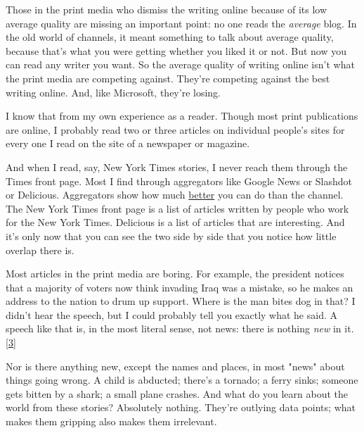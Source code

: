 Those in the print
                  media who dismiss the writing online because of its low
                  average quality are missing an important point: no one reads
                  the \emph{average} blog. In the old world of channels, it
                  meant something to talk about average quality, because that's
                  what you were getting whether you liked it or not. But now you
                  can read any writer you want. So the average quality of
                  writing online isn't what the print media are competing
                  against. They're competing against the best writing online.
                  And, like Microsoft, they're losing.

I know that
                  from my own experience as a reader. Though most print
                  publications are online, I probably read two or three articles
                  on individual people's sites for every one I read on the site
                  of a newspaper or magazine.

And when I read, say,
                  New York Times stories, I never reach them through the Times
                  front page. Most I find through aggregators like Google News
                  or Slashdot or Delicious. Aggregators show how much
                  \href{http://reddit.com}{better} you can do than the
                  channel. The New York Times front page is a list of articles
                  written by people who work for the New York Times. Delicious
                  is a list of articles that are interesting. And it's only now
                  that you can see the two side by side that you notice how
                  little overlap there is.

Most articles in the print
                  media are boring. For example, the president notices that a
                  majority of voters now think invading Iraq was a mistake, so
                  he makes an address to the nation to drum up support. Where is
                  the man bites dog in that? I didn't hear the speech, but I
                  could probably tell you exactly what he said. A speech like
                  that is, in the most literal sense, not news: there is nothing
                  \emph{new} in it.
                  [\href{\#f3n}{3}]

Nor is there anything new, except the names and
                  places, in most "news" about things going wrong. A child is
                  abducted; there's a tornado; a ferry sinks; someone gets
                  bitten by a shark; a small plane crashes. And what do you
                  learn about the world from these stories? Absolutely nothing.
                  They're outlying data points; what makes them gripping also
                  makes them irrelevant.

